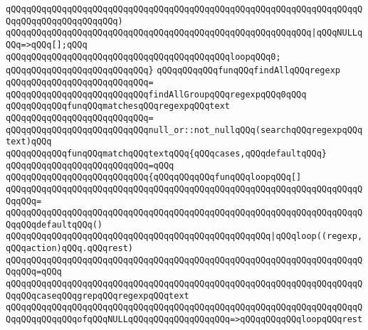 \verb|qQQqqQQqqQQqqQQqqQQqqQQqqQQqqQQqqQQqqQQqqQQqqQQqqQQqqQQqqQQqqQQqqQQqqQQqqQQqqQQqqQQqqQQqqQQq)|\newline
\newline
\verb|qQQqqQQqqQQqqQQqqQQqqQQqqQQqqQQqqQQqqQQqqQQqqQQqqQQqqQQqqQQq|\verb#|qQQqNULLqQQq=>qQQq[];qQQq#\newline
\newline
\verb|qQQqqQQqqQQqqQQqqQQqqQQqqQQqqQQqqQQqqQQqqQQqloopqQQq0;|\newline
\verb|qQQqqQQqqQQqqQQqqQQqqQQqqQQq}|\newline
\newline
\verb|qQQqqQQqqQQqfunqQQqfindAllqQQqregexp|\newline
\verb|qQQqqQQqqQQqqQQqqQQqqQQqqQQq=|\newline
\verb|qQQqqQQqqQQqqQQqqQQqqQQqqQQqfindAllGroupqQQqregexpqQQq0qQQq|\newline
\newline
\verb|qQQqqQQqqQQqfunqQQqmatchesqQQqregexpqQQqtext|\newline
\verb|qQQqqQQqqQQqqQQqqQQqqQQqqQQq=|\newline
\verb|qQQqqQQqqQQqqQQqqQQqqQQqqQQqnull_or::not_nullqQQq(searchqQQqregexpqQQqtext)qQQq|\newline
\newline
\verb|qQQqqQQqqQQqfunqQQqmatchqQQqtextqQQq{qQQqcases,qQQqdefaultqQQq}|\newline
\verb|qQQqqQQqqQQqqQQqqQQqqQQqqQQq=qQQq|\newline
\verb|qQQqqQQqqQQqqQQqqQQqqQQqqQQq{qQQqqQQqqQQqfunqQQqloopqQQq[]|\newline
\verb|qQQqqQQqqQQqqQQqqQQqqQQqqQQqqQQqqQQqqQQqqQQqqQQqqQQqqQQqqQQqqQQqqQQqqQQqqQQq=|\newline
\verb|qQQqqQQqqQQqqQQqqQQqqQQqqQQqqQQqqQQqqQQqqQQqqQQqqQQqqQQqqQQqqQQqqQQqqQQqqQQqdefaultqQQq()|\newline
\newline
\verb|qQQqqQQqqQQqqQQqqQQqqQQqqQQqqQQqqQQqqQQqqQQqqQQqqQQq|\verb#|qQQqloop((regexp,qQQqaction)qQQq.qQQqrest)#\newline
\verb|qQQqqQQqqQQqqQQqqQQqqQQqqQQqqQQqqQQqqQQqqQQqqQQqqQQqqQQqqQQqqQQqqQQqqQQqqQQq=qQQq|\newline
\verb|qQQqqQQqqQQqqQQqqQQqqQQqqQQqqQQqqQQqqQQqqQQqqQQqqQQqqQQqqQQqqQQqqQQqqQQqqQQqcaseqQQqgrepqQQqregexpqQQqtext|\newline
\newline
\verb|qQQqqQQqqQQqqQQqqQQqqQQqqQQqqQQqqQQqqQQqqQQqqQQqqQQqqQQqqQQqqQQqqQQqqQQqqQQqqQQqqQQqofqQQqNULLqQQqqQQqqQQqqQQqqQQq=>qQQqqQQqqQQqloopqQQqrest|\newline
